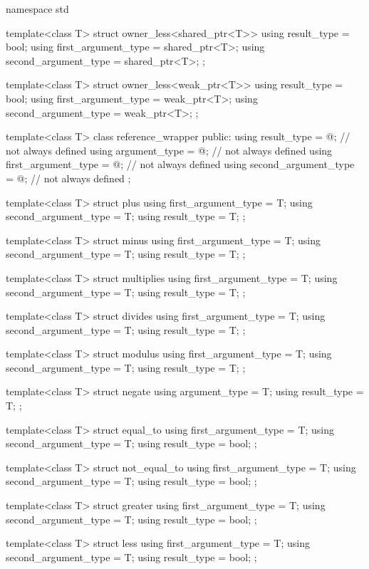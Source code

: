 \begin{codeblock}
namespace std {
  template<class T> struct owner_less<shared_ptr<T>> {
    using result_type          = bool;
    using first_argument_type  = shared_ptr<T>;
    using second_argument_type = shared_ptr<T>;
  };

  template<class T> struct owner_less<weak_ptr<T>> {
    using result_type          = bool;
    using first_argument_type  = weak_ptr<T>;
    using second_argument_type = weak_ptr<T>;
  };

  template<class T> class reference_wrapper {
  public:
    using result_type          = @\seebelow@; // not always defined
    using argument_type        = @\seebelow@; // not always defined
    using first_argument_type  = @\seebelow@; // not always defined
    using second_argument_type = @\seebelow@; // not always defined
  };

  template<class T> struct plus {
    using first_argument_type  = T;
    using second_argument_type = T;
    using result_type          = T;
  };

  template<class T> struct minus {
    using first_argument_type  = T;
    using second_argument_type = T;
    using result_type          = T;
  };

  template<class T> struct multiplies {
    using first_argument_type  = T;
    using second_argument_type = T;
    using result_type          = T;
  };

  template<class T> struct divides {
    using first_argument_type  = T;
    using second_argument_type = T;
    using result_type          = T;
  };

  template<class T> struct modulus {
    using first_argument_type  = T;
    using second_argument_type = T;
    using result_type          = T;
  };

  template<class T> struct negate {
    using argument_type = T;
    using result_type   = T;
  };

  template<class T> struct equal_to {
    using first_argument_type  = T;
    using second_argument_type = T;
    using result_type          = bool;
  };

  template<class T> struct not_equal_to {
    using first_argument_type  = T;
    using second_argument_type = T;
    using result_type          = bool;
  };

  template<class T> struct greater {
    using first_argument_type  = T;
    using second_argument_type = T;
    using result_type          = bool;
  };

  template<class T> struct less {
    using first_argument_type  = T;
    using second_argument_type = T;
    using result_type          = bool;
  };

}
\end{codeblock}
